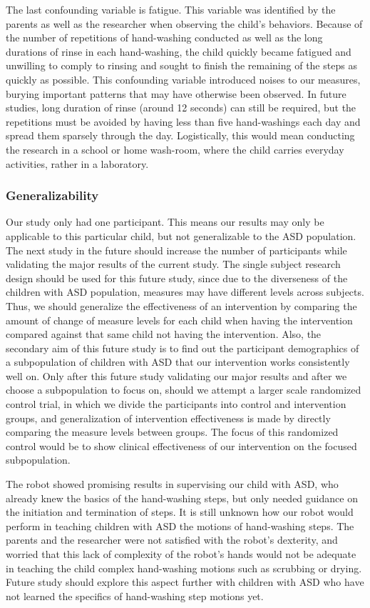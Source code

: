 The last confounding variable is fatigue.  This variable was identified by the parents as well as the researcher when observing the child's behaviors.  Because of the number of repetitions of hand-washing conducted as well as the long durations of rinse in each hand-washing, the child quickly became fatigued and unwilling to comply to rinsing and sought to finish the remaining of the steps as quickly as possible.  This confounding variable introduced noises to our measures, burying important patterns that may have otherwise been observed.  In future studies, long duration of rinse (around 12 seconds) can still be required, but the repetitions must be avoided by having less than five hand-washings each day and spread them sparsely through the day.  Logistically, this would mean conducting the research in a school or home wash-room, where the child carries everyday activities, rather in a laboratory.

\subsubsection{Generalizability}
Our study only had one participant.  This means our results may only be applicable to this particular child, but not generalizable to the ASD population.  The next study in the future should increase the number of participants while validating the major results of the current study.  The single subject research design should be used for this future study, since due to the diverseness of the children with ASD population, measures may have different levels across subjects.  Thus, we should generalize the effectiveness of an intervention by comparing the amount of change of measure levels for each child when having the intervention compared against that same child not having the intervention.  Also, the secondary aim of this future study is to find out the participant demographics of a subpopulation of children with ASD that our intervention works consistently well on.  Only after this future study validating our major results and after we choose a subpopulation to focus on, should we attempt a larger scale randomized control trial, in which we divide the participants into control and intervention groups, and generalization of intervention effectiveness is made by directly comparing the measure levels between groups.  The focus of this randomized control would be to show clinical effectiveness of our intervention on the focused subpopulation.

The robot showed promising results in supervising our child with ASD, who already knew the basics of the hand-washing steps, but only needed guidance on the initiation and termination of steps.  It is still unknown how our robot would perform in teaching children with ASD the motions of hand-washing steps.  The parents and the researcher were not satisfied with the robot's dexterity, and worried that this lack of complexity of the robot's hands would not be adequate in teaching the child complex hand-washing motions such as scrubbing or drying.  Future study should explore this aspect further with children with ASD who have not learned the specifics of hand-washing step motions yet.

